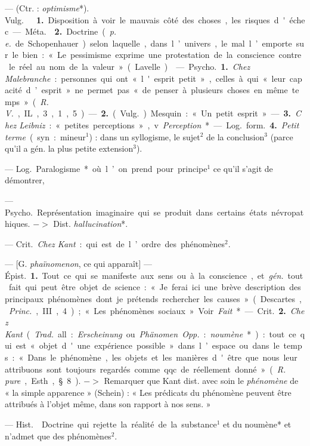 \begin{itemize}[leftmargin=1cm, label=, itemsep=1pt]
 — (Ctr. : {\it optimisme}*). \si{Vulg.} 
 {\bf 1.} Disposition à voir le mauvais côté des choses, les
risques d'échec. — \si{Méta.}  {\bf 2.} Doctrine ({\it p. e.}
de Schopenhauer) selon laquelle, dans l’univers, le mal l’emporte sur le
bien : « Le pessimisme exprime une protestation de la conscience contre le
réel au nom de la valeur » (Lavelle).

 — \si{Psycho.} {\bf 1.} {\it Chez Malebranche} : personnes qui ont
« l'esprit petit », celles à qui « leur capacité d’esprit » ne permet pas «
de penser à plusieurs choses en même temps » ({\it R. V.}, IL, 3, 1, 5). —
{\bf 2.} (\si{Vulg.}) Mesquin : « Un petit esprit ». — {\bf 3.} {\it Chez
Leibniz} : « petites perceptions », v. {\it Perception}*.

— \si{Log.} \si{form.} {\bf 4.} {\it Petit terme} (syn. :
mineur$^1$) : dans un syllogisme, le
sujet$^2$ de la conclusion$^3$ (parce qu’il
a gén. la plus petite extension$^3$).

 — \si{Log.} Paralogisme* où l’on prend pour
principe$^1$ ce qu'il s’agit de démontrer,

 — \si{Psycho.} Représentation imaginaire qui se produit dans
certains états névropathiques. $->$ Dist. {\it hallucination}*.

 — \si{Crit.} {\it Chez Kant} : qui
est de l’ordre des phénomènes$^2$.

 — [G. {\it phaïnomenon}, ce qui apparaît] — \si{Épist.}
{\bf 1.} Tout ce qui se manifeste aux sens ou à la conscience, et {\it gén.}
tout fait qui peut être objet de science : « Je ferai ici une brève
description des principaux phénomènes dont je prétends rechercher les causes
» (Descartes, {\it Princ.}, III, 4) ; « Les phénomènes sociaux ». Voir
{\it Fait}*.

— \si{Crit.} {\bf 2.} {\it Chez Kant} ({\it Trad.} all. : {\it Erscheinung}
ou {\it Phänomen}. {\it Opp.} : {\it noumène}*) : tout ce qui est « objet
d'une expérience possible » dans l’espace ou dans le temps : « Dans le
phénomène, les objets et les manières d'être que nous leur attribuons sont
toujours regardés comme qqc. de réellement donné » ({\it R. pure}, Esth., §
8). $->$ Remarquer que Kant dist. avec soin le {\it phénomène} de « la simple
apparence » (Schein) : « Les prédicats du phénomène peuvent être attribués à
l’objet même, dans son rapport à nos sens. »

 — \si{Hist.}  Doctrine qui rejette la
réalité de la substance$^1$ et du noumène* et n’admet que des phénomènes$^2$.


\end{itemize}
